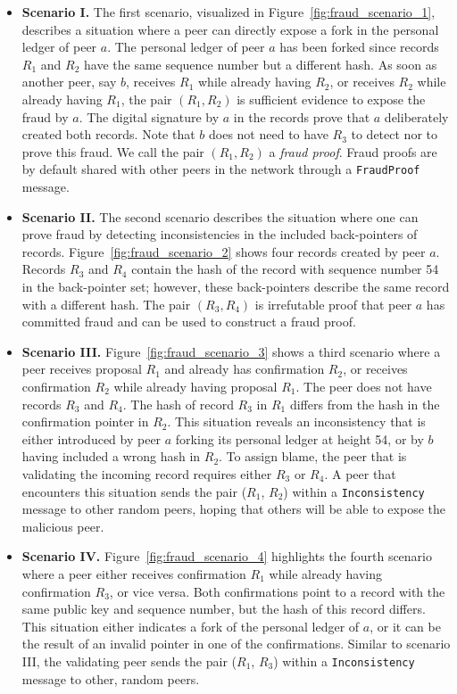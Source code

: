 \begin{itemize}
	\item \textbf{Scenario I.}
	The first scenario, visualized in Figure~\ref{fig:fraud_scenario_1}, describes a situation where a peer can directly expose a fork in the personal ledger of peer $ a $.
	The personal ledger of peer $ a $ has been forked since records $ R_1 $ and $ R_2 $ have the same sequence number but a different hash.
	As soon as another peer, say $ b $, receives $ R_1 $ while already having $ R_2 $, or receives $ R_2 $ while already having $ R_1 $, the pair $ (R_1, R_2) $ is sufficient evidence to expose the fraud by $ a $.
	The digital signature by $ a $ in the records prove that $ a $ deliberately created both records.
	Note that $ b $ does not need to have $ R_3 $ to detect nor to prove this fraud.
	We call the pair $ (R_1, R_2) $ a \emph{fraud proof}.
	Fraud proofs are by default shared with other peers in the network through a \texttt{FraudProof} message.
	\item \textbf{Scenario II.} The second scenario describes the situation where one can prove fraud by detecting inconsistencies in the included back-pointers of records.
	Figure~\ref{fig:fraud_scenario_2} shows four records created by peer $ a $.
	Records $ R_3 $ and $ R_4 $ contain the hash of the record with sequence number 54 in the back-pointer set; however, these back-pointers describe the same record with a different hash.
	The pair $ (R_3, R_4) $ is irrefutable proof that peer $ a $ has committed fraud and can be used to construct a fraud proof.
	\item \textbf{Scenario III.}
	Figure~\ref{fig:fraud_scenario_3} shows a third scenario where a peer receives proposal $ R_1 $ and already has confirmation $ R_2 $, or receives confirmation $ R_2 $ while already having proposal $ R_1 $.
	The peer does not have records $ R_3 $ and $ R_4 $.
	The hash of record $ R_3 $ in $ R_1 $ differs from the hash in the confirmation pointer in $ R_2 $.
	This situation reveals an inconsistency that is either introduced by peer $ a $ forking its personal ledger at height 54, or by $ b $ having included a wrong hash in $ R_2 $.
	To assign blame, the peer that is validating the incoming record requires either $ R_3 $ or $ R_4 $.
	A peer that encounters this situation sends the pair ($ R_1 $, $ R_2 $) within a \texttt{Inconsistency} message to other random peers, hoping that others will be able to expose the malicious peer.
	\item \textbf{Scenario IV.}
	Figure~\ref{fig:fraud_scenario_4} highlights the fourth scenario where a peer either receives confirmation $ R_1 $ while already having confirmation $ R_3 $, or vice versa.
	Both confirmations point to a record with the same public key and sequence number, but the hash of this record differs.
	This situation either indicates a fork of the personal ledger of $ a $, or it can be the result of an invalid pointer in one of the confirmations.
	Similar to scenario III, the validating peer sends the pair ($ R_1 $, $ R_3 $) within a \texttt{Inconsistency} message to other, random peers.
\end{itemize}

